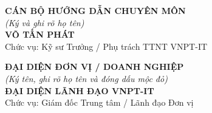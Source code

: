 \vspace{0.8cm}
\noindent
\begin{minipage}[t]{0.48\textwidth}
\centering
\textbf{CÁN BỘ HƯỚNG DẪN CHUYÊN MÔN}\\[0.1cm]
\textit{(Ký và ghi rõ họ tên)}\\[2.8cm]
\textbf{VÕ TẤN PHÁT}\\[0.1cm]
Chức vụ: Kỹ sư Trưởng / Phụ trách TTNT VNPT-IT
\end{minipage}
\hfill
\begin{minipage}[t]{0.48\textwidth}
\centering
\textbf{ĐẠI DIỆN ĐƠN VỊ / DOANH NGHIỆP}\\[0.1cm]
\textit{(Ký tên, ghi rõ họ tên và đóng dấu mộc đỏ)}\\[2.8cm]
\textbf{ĐẠI DIỆN LÃNH ĐẠO VNPT-IT}\\[0.1cm]
Chức vụ: Giám đốc Trung tâm / Lãnh đạo Đơn vị
\end{minipage}
